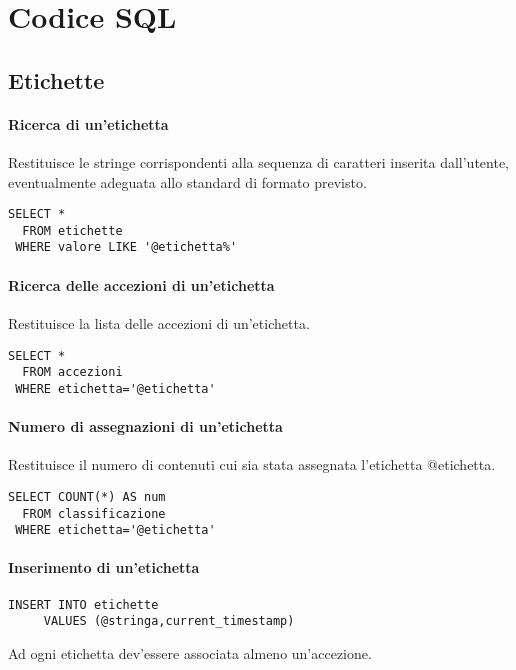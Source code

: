 \section*{Codice SQL}

\subsection*{Etichette}

\paragraph{Ricerca di un'etichetta}
Restituisce le stringe corrispondenti alla sequenza di caratteri inserita dall'utente, eventualmente adeguata allo standard di formato previsto.

\begin{verbatim}
SELECT *
  FROM etichette	
 WHERE valore LIKE '@etichetta%'
\end{verbatim}
	
\paragraph{Ricerca delle accezioni di un'etichetta}
Restituisce la lista delle accezioni di un'etichetta.
	
\begin{verbatim}
SELECT *
  FROM accezioni	
 WHERE etichetta='@etichetta'
\end{verbatim}

\paragraph{Numero di assegnazioni di un'etichetta}
Restituisce il numero di contenuti cui sia stata assegnata l'etichetta \textsf{@etichetta}.

\begin{verbatim}
SELECT COUNT(*) AS num
  FROM classificazione
 WHERE etichetta='@etichetta'
\end{verbatim}

\paragraph{Inserimento di un'etichetta}
	
\begin{verbatim}
INSERT INTO etichette
     VALUES (@stringa,current_timestamp)
\end{verbatim}

Ad ogni etichetta dev'essere associata almeno un'accezione.

